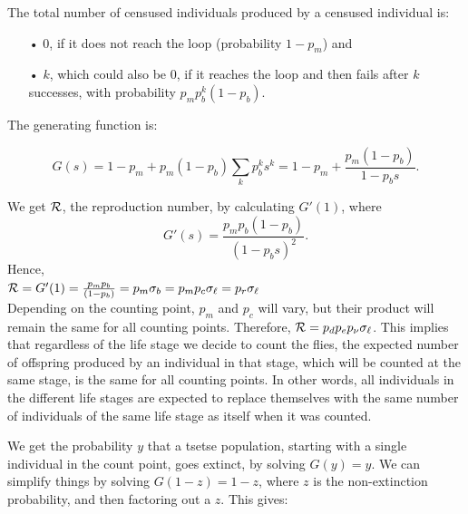\documentclass[smallextended]{svjour3}
\newcommand{\comment}[3]{\textcolor{#1}{\textbf{[#2: }\textit{#3}\textbf{]}}}
\newcommand{\jd}[1]{\comment{cyan}{JD}{#1}}
\newcommand{\eb}[1]{\comment{blue}{EB}{#1}}
\newcommand{\Rx}{\ensuremath{\cal R}}
\begin{document}
The total number of censused individuals produced by a censused individual is: 

\begin{itemize}
\item [•] 0, if it does not reach the loop (probability $1-p_m$) and
\item [•] $k$, which could also be 0, if it reaches the loop and then fails after $k$ successes, with probability $p_m p_b^k (1-p_b)$.\\
\end{itemize}  

The generating function is:


$$G(s) = 1-p_m + p_m (1-p_b) \sum_k p_b^k s^k = 1-p_m + \frac{p_m (1-p_b)}{1-p_b s}.$$



We get ${\cal R}$, the reproduction number, by calculating $G'(1)$, where $$G'(s) = \frac{p_m p_b (1-p_b)}{(1-p_b s)^2}.$$  Hence, \\

$ {\cal R}= G'(1) = \frac{p_m p_b}{(1-p_b)} = p_m \sigma_b = p_mp_c \sigma_\ell =  p_r\sigma_\ell$ \\
Depending on the counting point, $p_m$ and $p_c$ will vary, but their product will remain the same for all counting  points. Therefore, ${\cal R} =p_dp_ep_{\nu} \sigma_{\ell}$. This implies that regardless of the life stage we decide to count the flies, the expected number of offspring produced by an individual in that stage, which will be counted at the same stage, is the same for all counting points. In other words, all individuals in the different life stages are expected to replace themselves with the same number of individuals of the same life stage as itself when it was counted.


We get the probability $y$ that a tsetse population, starting with a single individual in the count point, goes extinct, by solving $G(y) = y$. We can simplify things by solving   $G(1-z) = 1-z$, where $z$ is the non-extinction probability, and then factoring out a $z$. This gives:
\end{document}
